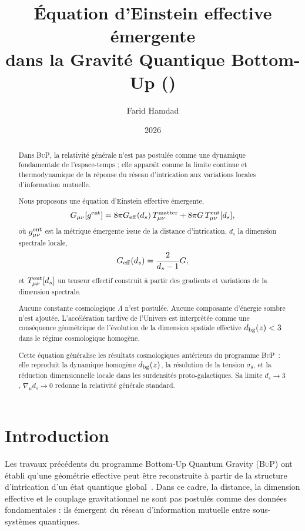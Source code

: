 \documentclass[11pt]{article}
\title{
  \textbf{\'Equation d'Einstein effective \'emergente\\
  dans la Gravit\'e Quantique Bottom-Up (\BuP)}
}
\author{Farid Hamdad}
\affil{
  Cadre Bottom-Up Quantum Gravity (\BuP)\\
  \small\url{https://github.com/Farid-Hamdad/Bottom-up-Quantum-Gravity}
}
\date{2026}
\newcommand{\Geff}{G_{\rm eff}}
\newcommand{\BuP}{\textsc{BuP}}
\newcommand{\ent}{\rm ent}
\begin{document}
\maketitle

\begin{abstract}
Dans \BuP, la relativit\'e g\'en\'erale n'est pas postul\'ee comme une dynamique fondamentale
de l'espace-temps ; elle appara\^{\i}t comme la limite continue et thermodynamique de la
r\'eponse du r\'eseau d'intrication aux variations locales d'information mutuelle.

Nous proposons une \'equation d'Einstein effective \'emergente,
\[
G_{\mu\nu}[g^{\ent}]
=
8\pi\Geff(d_s)\,T_{\mu\nu}^{\rm matter}
+
8\pi G\,T_{\mu\nu}^{\ent}[d_s],
\]
o\`u $g^{\ent}_{\mu\nu}$ est la m\'etrique \'emergente issue de la distance d'intrication,
$d_s$ la dimension spectrale locale,
\[
\Geff(d_s)=\frac{2}{d_s-1}G,
\]
et $T_{\mu\nu}^{\ent}[d_s]$ un tenseur effectif construit \`a partir des gradients et
variations de la dimension spectrale.

Aucune constante cosmologique $\Lambda$ n'est postul\'ee. Aucune composante d'\'energie
sombre n'est ajout\'ee. L'acc\'el\'eration tardive de l'Univers est interpr\'et\'ee comme
une cons\'equence g\'eom\'etrique de l'\'evolution de la dimension spatiale effective
$d_{\rm bg}(z) < 3$ dans le r\'egime cosmologique homog\`ene.

Cette \'equation g\'en\'eralise les r\'esultats cosmologiques ant\'erieurs du programme
\BuP\ : elle reproduit la dynamique homog\`ene $d_{\rm bg}(z)$, la r\'esolution de la
tension $\sigma_8$, et la r\'eduction dimensionnelle locale dans les surdensit\'es
proto-galactiques. Sa limite $d_s\rightarrow 3$, $\nabla_\mu d_s\rightarrow 0$ redonne
la relativit\'e g\'en\'erale standard.
\end{abstract}

\section{Introduction}

Les travaux pr\'ec\'edents du programme Bottom-Up Quantum Gravity (\BuP) ont \'etabli
qu'une g\'eom\'etrie effective peut \^etre reconstruite \`a partir de la structure
d'intrication d'un \'etat quantique global~\cite{hamdad2026bup}. Dans ce cadre, la
distance, la dimension effective et le couplage gravitationnel ne sont pas postul\'es
comme des donn\'ees fondamentales : ils \'emergent du r\'eseau d'information mutuelle
entre sous-syst\`emes quantiques.
\end{document}
